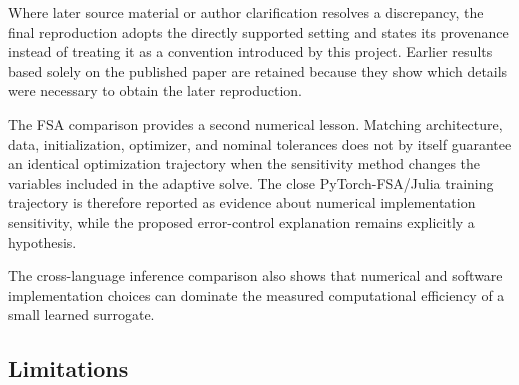 \documentclass[11pt,a4paper]{article}
\begin{document}
Where later source material or author clarification resolves a discrepancy, the final reproduction adopts the directly supported setting and states its provenance instead of treating it as a convention introduced by this project. Earlier results based solely on the published paper are retained because they show which details were necessary to obtain the later reproduction.

The FSA comparison provides a second numerical lesson. Matching architecture, data, initialization, optimizer, and nominal tolerances does not by itself guarantee an identical optimization trajectory when the sensitivity method changes the variables included in the adaptive solve. The close PyTorch-FSA/Julia training trajectory is therefore reported as evidence about numerical implementation sensitivity, while the proposed error-control explanation remains explicitly a hypothesis.

The cross-language inference comparison also shows
that numerical and software implementation choices
can dominate the measured computational efficiency
of a small learned surrogate.

\subsection{Limitations}
\end{document}
